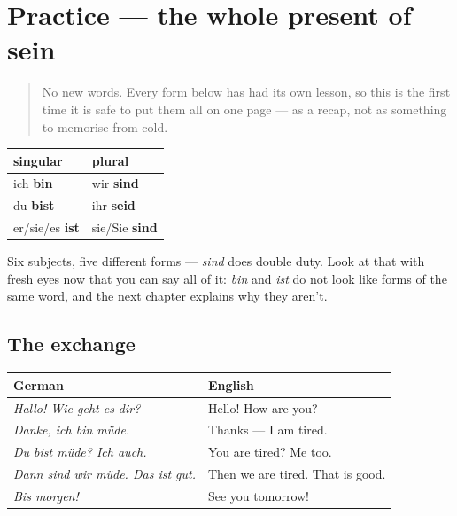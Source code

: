 \section[Practice]{Practice — the whole present of sein}

\label{lesson:GE-C16-praesens-practice}



\begin{quote}
No new words. Every form below has had its own lesson, so this is the first time it is safe to put them all on one page — as a recap, not as something to memorise from cold.
\end{quote}

\begin{grammarlens}[title={Grammar Lens: the six forms, assembled}]
\noindent
\begin{tabularx}{\linewidth}{@{}>{\raggedright\arraybackslash}X>{\raggedright\arraybackslash}X@{}}
\toprule
\textbf{singular} & \textbf{plural} \\
\midrule
ich \textbf{bin} & wir \textbf{sind} \\
du \textbf{bist} & ihr \textbf{seid} \\
er/sie/es \textbf{ist} & sie/Sie \textbf{sind} \\
\bottomrule
\end{tabularx}

Six subjects, five different forms — \emph{sind} does double duty. Look at that with fresh eyes now that you can say all of it: \emph{bin} and \emph{ist} do not look like forms of the same word, and the next chapter explains why they aren't.
\end{grammarlens}

\subsection*{The exchange}
\noindent
\begin{tabularx}{\linewidth}{@{}>{\raggedright\arraybackslash}X>{\raggedright\arraybackslash}X@{}}
\toprule
\textbf{German} & \textbf{English} \\
\midrule
\emph{Hallo! Wie geht es dir?} & Hello! How are you? \\
\emph{Danke, ich bin müde.} & Thanks — I am tired. \\
\emph{Du bist müde? Ich auch.} & You are tired? Me too. \\
\emph{Dann sind wir müde. Das ist gut.} & Then we are tired. That is good. \\
\emph{Bis morgen!} & See you tomorrow! \\
\bottomrule
\end{tabularx}

